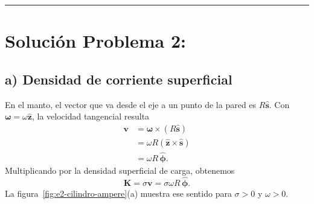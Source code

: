 \documentclass[11pt]{article}
\begin{document}
\vspace{0.4cm}
\hrule
\vspace{0.5cm}

\section*{Solución Problema 2:}

\subsection*{a) Densidad de corriente superficial}
En el manto, el vector que va desde el eje a un punto de la pared
es $R\hat{\mathbf s}$. Con $\boldsymbol\omega=\omega\hat{\mathbf z}$,
la velocidad tangencial resulta
\begin{align*}
    \mathbf v
    &=\boldsymbol\omega\times(R\hat{\mathbf s})\\
    &=\omega R(\hat{\mathbf z}\times\hat{\mathbf s})\\
    &=\omega R\,\hat{\boldsymbol\phi}.
\end{align*}
Multiplicando por la densidad superficial de carga, obtenemos
\[
    \mathbf K=\sigma\mathbf v=\sigma\omega R\,\hat{\boldsymbol\phi}.
\]
La figura~\ref{fig:e2-cilindro-ampere}(a) muestra ese sentido
para $\sigma>0$ y $\omega>0$.
\end{document}

